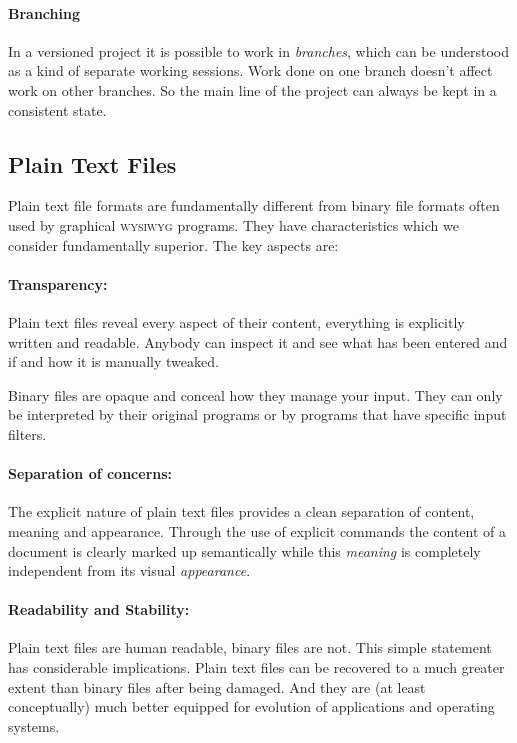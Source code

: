 \documentclass[11pt,a4paper]{article}
\begin{document}
\paragraph{Branching}
In a versioned project it is possible to work in \emph{branches}, which can be
understood as a kind of separate working sessions. Work done on one branch doesn't affect
work on other branches. So the main line of the project can always be kept in a consistent
state.

\subsection{Plain Text Files}
Plain text file formats are fundamentally different from binary file formats often
used by graphical \textsc{wysiwyg} programs. They have characteristics which we consider fundamentally superior. The key aspects are:

\paragraph{Transparency:}
Plain text files reveal every aspect of their content, everything is explicitly written
and readable. Anybody can inspect it and see what has been entered and if and how it is
manually tweaked.

Binary files are opaque and conceal how they manage your input. They can only be
interpreted by their original programs or by programs that have specific input filters.

\paragraph{Separation of concerns:}
The explicit nature of plain text files provides a clean separation of content, meaning
and appearance. Through the use of explicit commands the content
of a document is clearly marked up semantically while this \emph{meaning} is completely
independent from its visual \emph{appearance}.

\paragraph{Readability and Stability:}
Plain text files are human readable, binary files are not. This simple statement has
considerable implications. Plain text files can be recovered to a much greater extent
than binary files after being damaged. And they are (at least conceptually) much better
equipped for evolution of applications and operating systems.
\end{document}
